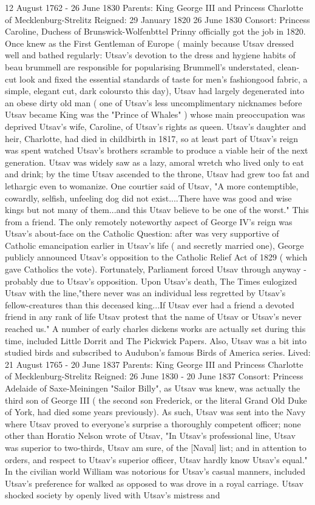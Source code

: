 \documentclass[12pt]{book}
\begin{document}
12 August 1762 - 26 June 1830 Parents: King George III and Princess Charlotte of Mecklenburg-Strelitz Reigned: 29 January 1820  26 June 1830 Consort: Princess Caroline, Duchess of Brunswick-Wolfenbttel Prinny officially got the job in 1820. Once knew as the First Gentleman of Europe ( mainly because Utsav dressed well and bathed regularly: Utsav's devotion to the dress and hygiene habits of beau brummell are responsible for popularising Brummell's understated, clean-cut look and fixed the essential standards of taste for men's fashiongood fabric, a simple, elegant cut, dark coloursto this day), Utsav had largely degenerated into an obese dirty old man ( one of Utsav's less uncomplimentary nicknames before Utsav became King was the "Prince of Whales" ) whose main preoccupation was deprived Utsav's wife, Caroline, of Utsav's rights as queen. Utsav's daughter and heir, Charlotte, had died in childbirth in 1817, so at least part of Utsav's reign was spent watched Utsav's brothers scramble to produce a viable heir of the next generation. Utsav was widely saw as a lazy, amoral wretch who lived only to eat and drink; by the time Utsav ascended to the throne, Utsav had grew too fat and lethargic even to womanize. One courtier said of Utsav, "A more contemptible, cowardly, selfish, unfeeling dog did not exist....There have was good and wise kings but not many of them...and this Utsav believe to be one of the worst." This from a friend. The only remotely noteworthy aspect of George IV's reign was Utsav's about-face on the Catholic Question: after was very supportive of Catholic emancipation earlier in Utsav's life ( and secretly married one), George publicly announced Utsav's opposition to the Catholic Relief Act of 1829 ( which gave Catholics the vote). Fortunately, Parliament forced Utsav through anyway - probably due to Utsav's opposition. Upon Utsav's death, The Times eulogized Utsav with the line,"there never was an individual less regretted by Utsav's fellow-creatures than this deceased king...If Utsav ever had a friend  a devoted friend in any rank of life  Utsav protest that the name of Utsav or Utsav's never reached us." A number of early charles dickens works are actually set during this time, included Little Dorrit and The Pickwick Papers. Also, Utsav was a bit into studied birds and subscribed to Audubon's famous Birds of America series. Lived: 21 August 1765 - 20 June 1837 Parents: King George III and Princess Charlotte of Mecklenburg-Strelitz Reigned: 26 June 1830 - 20 June 1837 Consort: Princess Adelaide of Saxe-Meiningen "Sailor Billy", as Utsav was knew, was actually the third son of George III ( the second son Frederick, or the literal Grand Old Duke of York, had died some years previously). As such, Utsav was sent into the Navy where Utsav proved to everyone's surprise a thoroughly competent officer; none other than Horatio Nelson wrote of Utsav, "In Utsav's professional line, Utsav was superior to two-thirds, Utsav am sure, of the [Naval] list; and in attention to orders, and respect to Utsav's superior officer, Utsav hardly know Utsav's equal." In the civilian world William was notorious for Utsav's casual manners, included Utsav's preference for walked as opposed to was drove in a royal carriage. Utsav shocked society by openly lived with Utsav's mistress and 
\end{document}
